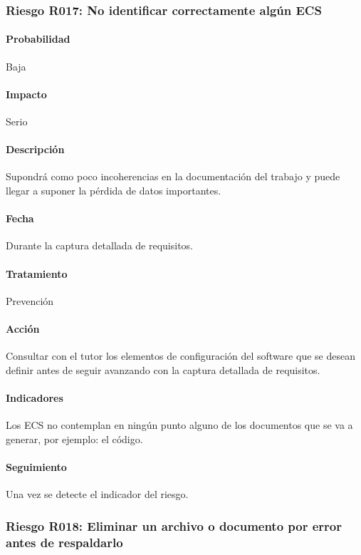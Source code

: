 \documentclass[10pt,a4paper]{article}
\begin{document}
			\subsubsection{Riesgo R017: No identificar correctamente algún ECS }
				\paragraph{Probabilidad} Baja
				\paragraph{Impacto}	Serio
				\paragraph{Descripción} Supondrá como poco incoherencias en la documentación del trabajo y puede llegar a suponer la pérdida de datos importantes.
				\paragraph{Fecha} Durante la captura detallada de requisitos. %
				\paragraph{Tratamiento} Prevención %
				\paragraph{Acción} Consultar con el tutor los elementos de configuración del software que se desean definir antes de seguir avanzando con la captura detallada de requisitos.%
				\paragraph{Indicadores} Los ECS no contemplan en ningún punto alguno de los documentos que se va a generar, por ejemplo: el código. %
				\paragraph{Seguimiento}	Una vez se detecte el indicador del riesgo.  %
			
			\subsubsection{Riesgo R018: Eliminar un archivo o documento por error antes de respaldarlo}
\end{document}

